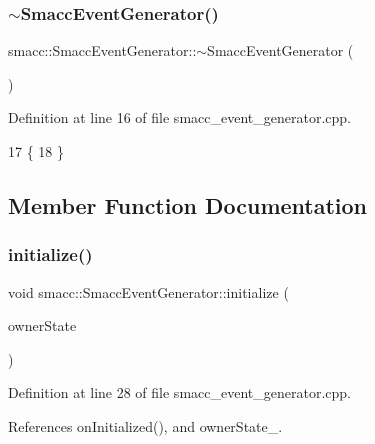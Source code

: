 \subsubsection{\texorpdfstring{$\sim$\+Smacc\+Event\+Generator()}{~SmaccEventGenerator()}}
{\footnotesize\ttfamily smacc\+::\+Smacc\+Event\+Generator\+::$\sim$\+Smacc\+Event\+Generator (\begin{DoxyParamCaption}{ }\end{DoxyParamCaption})\hspace{0.3cm}{\ttfamily [virtual]}}



Definition at line 16 of file smacc\+\_\+event\+\_\+generator.\+cpp.


\begin{DoxyCode}
17     \{
18     \}
\end{DoxyCode}


\subsection{Member Function Documentation}
\mbox{\label{classsmacc_1_1SmaccEventGenerator_a804f2d42ef9a834a2729376de2f2f4e4}} 
\subsubsection{\texorpdfstring{initialize()}{initialize()}}
{\footnotesize\ttfamily void smacc\+::\+Smacc\+Event\+Generator\+::initialize (\begin{DoxyParamCaption}\item[{\hyperlink{classsmacc_1_1ISmaccState}{smacc\+::\+I\+Smacc\+State} $\ast$}]{owner\+State }\end{DoxyParamCaption})}



Definition at line 28 of file smacc\+\_\+event\+\_\+generator.\+cpp.



References on\+Initialized(), and owner\+State\+\_\+.


